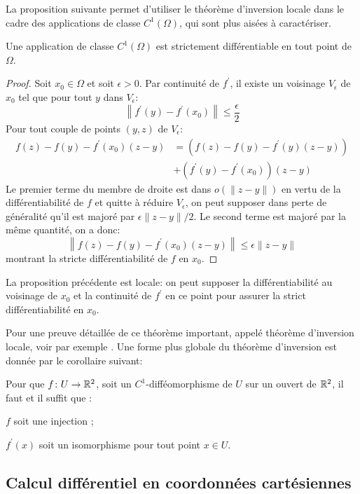 La proposition suivante permet d'utiliser le théorème d'inversion locale dans le cadre des applications de classe $C^1(\Omega)$, qui sont plus aisées à caractériser.
\begin{fprop}
Une application de classe $C^1(\Omega)$ est strictement différentiable en tout point de $\Omega$.
\end{fprop}
\begin{proof}
Soit $x_0\in \Omega$ et soit $\epsilon > 0$. Par continuité de $f^\prime$, il existe un voisinage $V_\epsilon$ de 
$x_0$ tel que pour tout $y$ dans $V_\epsilon$:
\[
\left\| f^{\prime}(y)-f^\prime(x_0) \right\| \leq \frac{\epsilon}{2} 
\]
Pour tout couple de points $(y,z)$ de $V_\epsilon$:
\begin{align*}
f(z)-f(y)-f^\prime(x_0)(z-y) & = \left(f(z)-f(y)-f^\prime(y)(z-y) \right)  \\
& + \left(f^\prime(y)-f^\prime(x_0)\right)(z-y)
\end{align*}
Le premier terme du membre de droite est dans $o(\|z-y\|)$ en vertu de la différentiabilité de $f$ et quitte à réduire $V_\epsilon$, on peut supposer dans perte de généralité qu'il est majoré par $\epsilon \|z-y\| /2$. Le second terme est majoré par la même quantité, on a donc:
\[
\left\|f(z)-f(y)-f^\prime(x_0)(z-y)\right \| \leq  \epsilon \|z-y\|
\]
montrant la stricte différentiabilité de $f$ en $x_0$.
\end{proof}
La proposition précédente est locale: on peut supposer la différentiabilité au voisinage de $x_0$ et la continuité de $f^\prime$ en ce point pour assurer la strict différentiabilité en $x_0$.


Pour une preuve détaillée de ce théorème important, appelé théorème d'inversion locale, voir par exemple \cite{cartan1977, pham1996}.
 Une forme plus globale du théorème d'inversion est donnée par le corollaire suivant:

\begin{cor} Pour que $f \colon U \to \mathbb R^2$, soit un $C^1$-difféomorphisme de $U$ sur un ouvert de $\mathbb R^2$, il faut et il suffit que :
\begin{MYenumerate}
\item $f$ soit une injection ;
\item $f^\prime(x)$ soit un isomorphisme pour tout point $x \in U$.
\end{MYenumerate}
\end{cor}


\subsection{Calcul différentiel en coordonnées cartésiennes}

